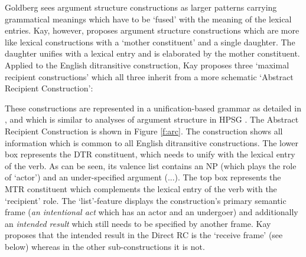 Goldberg sees argument structure constructions as larger patterns carrying grammatical meanings which have to be `fused' with the meaning of the lexical entries. Kay, however, proposes argument structure constructions which are more like lexical constructions with a `mother constituent' and a single daughter. The daughter unifies with a lexical entry and is elaborated by the mother constituent. Applied to the English ditransitive construction, Kay proposes three `maximal recipient constructions' which all three inherit from a more schematic `Abstract Recipient Construction':

\ea
{}
\z

These constructions are represented in a unification-based grammar as detailed in \citet{kay99grammatical}, and which is similar to analyses of argument structure in HPSG \citep{sag94hpsg}. The Abstract Recipient Construction is shown in Figure \ref{f:arc}. The construction shows all information which is common to all English ditransitive constructions. The lower box represents the DTR constituent, which needs to unify with the lexical entry of the verb. As can be seen, its valence list contains an NP (which plays the role of `actor') and an under-specified argument (...). The top box represents the MTR constituent which complements the lexical entry of the verb with the `recipient' role. The `list'-feature displays the construction's primary semantic frame ({\em an intentional act} which has an actor and an undergoer) and additionally an {\em intended result} which still needs to be specified by another frame. Kay proposes that the intended result in the Direct RC is the `receive frame' (see below) whereas in the other sub-constructions it is not.

